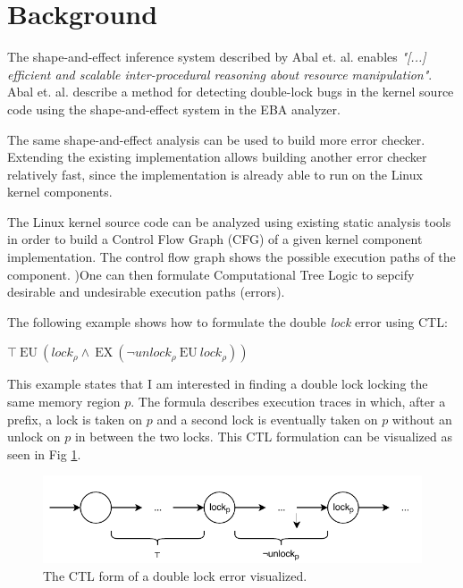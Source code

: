 \section{Background}

The shape-and-effect inference system described by Abal et. al. \cite{Abal2017EffectiveBF} enables \textit{"[...] efficient and scalable inter-procedural reasoning about resource manipulation"}. Abal et. al. describe a method for detecting double-lock bugs in the kernel source code using the shape-and-effect system in the EBA analyzer.

\newpar The same shape-and-effect analysis can be used to build more error checker. Extending the existing implementation allows building another error checker relatively fast, since the implementation is already able to run on the Linux kernel components.

\newpar The Linux kernel source code can be analyzed using existing static analysis tools in order to build a Control Flow Graph (CFG) of a given kernel component implementation. The control flow graph shows the possible execution paths of the component. )One can then formulate Computational Tree Logic to sepcify desirable and undesirable execution paths (errors). 

\newpar The following example shows how to formulate the double \textit{lock} error using CTL: 

\begin{center}
    $\top\:\mathrm{EU}\:\left({l o c k}_{\rho} \wedge\:\mathrm{EX}\:\left(\neg {u n l o c k}_{\rho}\:\mathrm{EU}\:{l o c k}_{\rho}\right)\right)$
\end{center}

\newpar This example states that I am interested in finding a double lock locking the same memory region $p$. The formula describes execution traces in which, after a prefix, a lock is taken on $p$ and a second lock is eventually taken on $p$ without an unlock on $p$ in between the two locks. This CTL formulation can be visualized as seen in Fig \ref{fig:doublelock}.

\begin{figure}[h]
    \centering
    \includegraphics{background/figures/doublelock}
    \caption{The CTL form of a double lock error visualized.}
    \label{fig:doublelock}
\end{figure}

